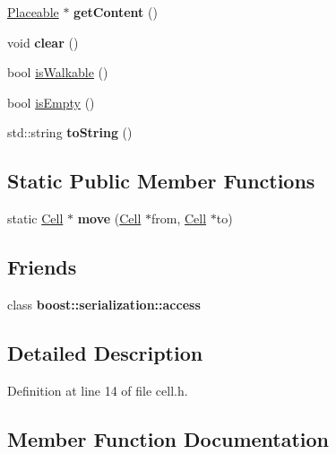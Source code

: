\begin{DoxyCompactItemize}
\hyperlink{class_placeable}{Placeable} $\ast$ {\bfseries get\+Content} ()
\item 
\hypertarget{class_cell_a275274592fde050fefcda8515b5a8d3f}{}\label{class_cell_a275274592fde050fefcda8515b5a8d3f} 
void {\bfseries clear} ()
\item 
bool \hyperlink{class_cell_af8625542ca100de4cc6e221ea131f05c}{is\+Walkable} ()
\item 
bool \hyperlink{class_cell_a6c7344ef2aa917e70364221bf86ff8bc}{is\+Empty} ()
\item 
\hypertarget{class_cell_a115541b42cd152e9557d527f6ea3e471}{}\label{class_cell_a115541b42cd152e9557d527f6ea3e471} 
std\+::string {\bfseries to\+String} ()
\end{DoxyCompactItemize}
\subsection*{Static Public Member Functions}
\begin{DoxyCompactItemize}
\item 
\hypertarget{class_cell_ac3a2780a20988ddcfd29aa460dbb7a9e}{}\label{class_cell_ac3a2780a20988ddcfd29aa460dbb7a9e} 
static \hyperlink{class_cell}{Cell} $\ast$ {\bfseries move} (\hyperlink{class_cell}{Cell} $\ast$from, \hyperlink{class_cell}{Cell} $\ast$to)
\end{DoxyCompactItemize}
\subsection*{Friends}
\begin{DoxyCompactItemize}
\item 
\hypertarget{class_cell_ac98d07dd8f7b70e16ccb9a01abf56b9c}{}\label{class_cell_ac98d07dd8f7b70e16ccb9a01abf56b9c} 
class {\bfseries boost\+::serialization\+::access}
\end{DoxyCompactItemize}


\subsection{Detailed Description}


Definition at line 14 of file cell.\+h.



\subsection{Member Function Documentation}
\hypertarget{class_cell_a90d2e75867bd5f2b553dec1498fdf4e6}{}\label{class_cell_a90d2e75867bd5f2b553dec1498fdf4e6} 
